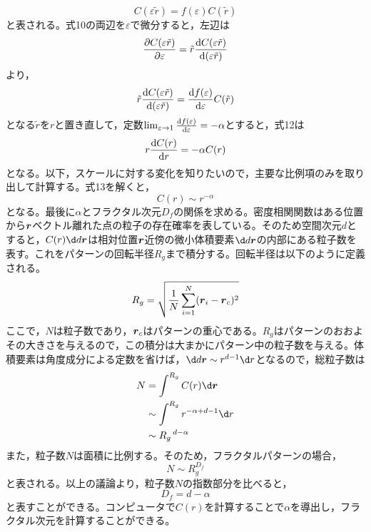 \documentclass{ltjsarticle}
\begin{document}
\begin{equation}
  C(\varepsilon \tilde{r})=f(\varepsilon)C(\tilde{r})
\end{equation}
と表される。式10の両辺を$\varepsilon$で微分すると，左辺は
\begin{equation}
  \pdv{C(\varepsilon \tilde{r})}{\varepsilon}=\tilde{r}\odv{C(\varepsilon \tilde{r})}{(\varepsilon \tilde{r})}
\end{equation}
より，
\begin{equation}
  \tilde{r}\odv{C(\varepsilon \tilde{r})}{(\varepsilon \tilde{r})}=\odv{f(\varepsilon)}{\varepsilon}C(\tilde{r})
\end{equation}
となる$\tilde{r}$を$r$と置き直して，定数$\lim_{\varepsilon \to 1}\odv{f(\varepsilon)}{\varepsilon}
  =-\alpha$とすると，式12は
\begin{equation}
  r\odv{C(r)}{r}=-\alpha C(r)
\end{equation}
となる。以下，スケールに対する変化を知りたいので，主要な比例項のみを取り出して計算する。式13を解くと，
\begin{equation}
  C(r)\sim r^{-\alpha}
\end{equation}
となる。最後に$\alpha$とフラクタル次元$D_f$の関係を求める。密度相関関数はある位置から$\vb*{r}$ベクトル離れた点の粒子の存在確率を表している。そのため空間次元$d$とすると，$C(r)\d d{\vb*{r}}$は相対位置$\vb*{r}$近傍の微小体積要素$\d d \vb*{r}$の内部にある粒子数を表す。これをパターンの回転半径$R_g$まで積分する。回転半径は以下のように定義される。
\begin{equation}
  R_g=\sqrt{\frac{1}{N}\sum^{N}_{i=1}(\vb*{r}_i-\vb*{r}_c)^2}
\end{equation}
ここで，$N$は粒子数であり，$\vb*{r}_c$はパターンの重心である。$R_g$はパターンのおおよその大きさを与えるので，この積分は大まかにパターン中の粒子数を与える。体積要素は角度成分による定数を省けば，$\d d\vb*{r}\sim r^{d-1}\d r$となるので，総粒子数は
\begin{equation}
  \begin{split}
    N & =\int^{R_g}C(r)\d \vb*{r}         \\
      & \sim\int^{R_g}r^{-\alpha+d-1}\d r \\
      & \sim R_g\,^{d-\alpha}
  \end{split}
\end{equation}
また，粒子数$N$は面積に比例する。そのため，フラクタルパターンの場合，
\begin{equation}
  N\sim R_g^{D_f}
\end{equation}
と表される。以上の議論より，粒子数$N$の指数部分を比べると，
\begin{equation}
  D_f=d-\alpha
\end{equation}
と表すことができる。コンピュータで$C(r)$を計算することで$\alpha$を導出し，フラクタル次元を計算することができる。
\end{document}
